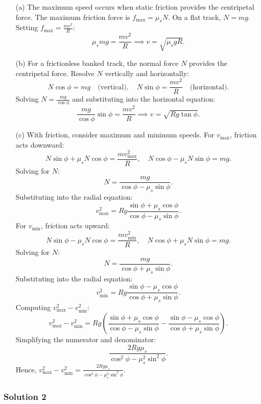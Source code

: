 \documentclass{article}
\begin{document}
\begin{enumerate}
    \item[(a)] The maximum speed occurs when static friction provides the centripetal force. The maximum friction force is \( f_{\text{max}} = \mu_s N \). On a flat track, \( N = mg \). Setting \( f_{\text{max}} = \frac{mv^2}{R} \):
    \[
    \mu_s mg = \frac{mv^2}{R} \implies v = \sqrt{\mu_s g R}.
    \]
    
    \item[(b)] For a frictionless banked track, the normal force \( N \) provides the centripetal force. Resolve \( N \) vertically and horizontally:
    \[
    N \cos\phi = mg \quad \text{(vertical)}, \quad N \sin\phi = \frac{mv^2}{R} \quad \text{(horizontal)}.
    \]
    Solving \( N = \frac{mg}{\cos\phi} \) and substituting into the horizontal equation:
    \[
    \frac{mg}{\cos\phi} \sin\phi = \frac{mv^2}{R} \implies v = \sqrt{Rg \tan\phi}.
    \]
    
    \item[(c)] With friction, consider maximum and minimum speeds. For \( v_{\text{max}} \), friction acts downward:
    \[
    N \sin\phi + \mu_s N \cos\phi = \frac{mv_{\text{max}}^2}{R}, \quad N \cos\phi - \mu_s N \sin\phi = mg.
    \]
    Solving for \( N \):
    \[
    N = \frac{mg}{\cos\phi - \mu_s \sin\phi}.
    \]
    Substituting into the radial equation:
    \[
    v_{\text{max}}^2 = Rg \frac{\sin\phi + \mu_s \cos\phi}{\cos\phi - \mu_s \sin\phi}.
    \]
    For \( v_{\text{min}} \), friction acts upward:
    \[
    N \sin\phi - \mu_s N \cos\phi = \frac{mv_{\text{min}}^2}{R}, \quad N \cos\phi + \mu_s N \sin\phi = mg.
    \]
    Solving for \( N \):
    \[
    N = \frac{mg}{\cos\phi + \mu_s \sin\phi}.
    \]
    Substituting into the radial equation:
    \[
    v_{\text{min}}^2 = Rg \frac{\sin\phi - \mu_s \cos\phi}{\cos\phi + \mu_s \sin\phi}.
    \]
    Computing \( v_{\text{max}}^2 - v_{\text{min}}^2 \):
    \[
    v_{\text{max}}^2 - v_{\text{min}}^2 = Rg \left( \frac{\sin\phi + \mu_s \cos\phi}{\cos\phi - \mu_s \sin\phi} - \frac{\sin\phi - \mu_s \cos\phi}{\cos\phi + \mu_s \sin\phi} \right).
    \]
    Simplifying the numerator and denominator:
    \[
    \frac{2Rg\mu_s}{\cos^2\phi - \mu_s^2 \sin^2\phi}.
    \]
    Hence, \( v_{\text{max}}^2 - v_{\text{min}}^2 = \frac{2Rg\mu_s}{\cos^2\phi - \mu_s^2 \sin^2\phi} \).
\end{enumerate}

\subsubsection{Solution 2}
\end{document}
